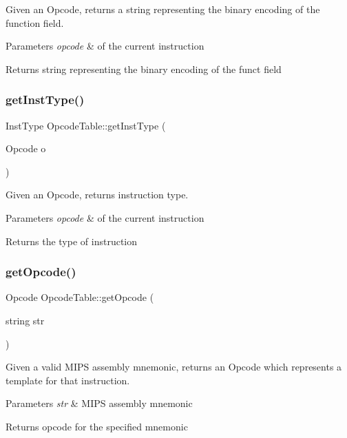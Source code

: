 Given an Opcode, returns a string representing the binary encoding of the function field. 
\begin{DoxyParams}{Parameters}
{\em opcode} & of the current instruction \\
\hline
\end{DoxyParams}
\begin{DoxyReturn}{Returns}
string representing the binary encoding of the funct field 
\end{DoxyReturn}
\mbox{\label{class_opcode_table_a6674e2b4716bddcaf2514a54bf63a5e4}} 
\subsubsection{\texorpdfstring{get\+Inst\+Type()}{getInstType()}}
{\footnotesize\ttfamily Inst\+Type Opcode\+Table\+::get\+Inst\+Type (\begin{DoxyParamCaption}\item[{Opcode}]{o }\end{DoxyParamCaption})}

Given an Opcode, returns instruction type. 
\begin{DoxyParams}{Parameters}
{\em opcode} & of the current instruction \\
\hline
\end{DoxyParams}
\begin{DoxyReturn}{Returns}
the type of instruction 
\end{DoxyReturn}
\mbox{\label{class_opcode_table_a0710950ceccf23e2e13d34ff51b332ce}} 
\subsubsection{\texorpdfstring{get\+Opcode()}{getOpcode()}}
{\footnotesize\ttfamily Opcode Opcode\+Table\+::get\+Opcode (\begin{DoxyParamCaption}\item[{string}]{str }\end{DoxyParamCaption})}

Given a valid M\+I\+PS assembly mnemonic, returns an Opcode which represents a template for that instruction. 
\begin{DoxyParams}{Parameters}
{\em str} & M\+I\+PS assembly mnemonic \\
\hline
\end{DoxyParams}
\begin{DoxyReturn}{Returns}
opcode for the specified mnemonic 
\end{DoxyReturn}
\mbox{\label{class_opcode_table_af89738c82bb2406fa8eadf1639a86218}} 
